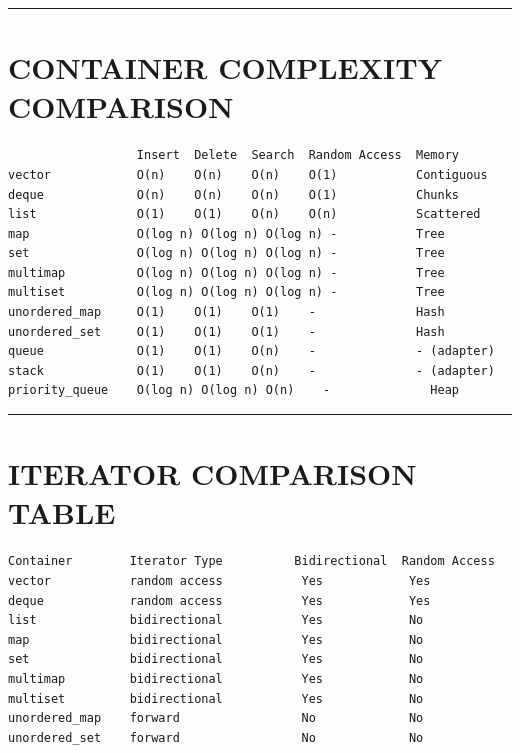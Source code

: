 \begin{center}\rule{0.5\linewidth}{0.5pt}\end{center}

\hypertarget{container-complexity-comparison}{%
\section{CONTAINER COMPLEXITY
COMPARISON}\label{container-complexity-comparison}}

\begin{lstlisting}
                  Insert  Delete  Search  Random Access  Memory
vector            O(n)    O(n)    O(n)    O(1)           Contiguous
deque             O(n)    O(n)    O(n)    O(1)           Chunks
list              O(1)    O(1)    O(n)    O(n)           Scattered
map               O(log n) O(log n) O(log n) -           Tree
set               O(log n) O(log n) O(log n) -           Tree
multimap          O(log n) O(log n) O(log n) -           Tree
multiset          O(log n) O(log n) O(log n) -           Tree
unordered_map     O(1)    O(1)    O(1)    -              Hash
unordered_set     O(1)    O(1)    O(1)    -              Hash
queue             O(1)    O(1)    O(n)    -              - (adapter)
stack             O(1)    O(1)    O(n)    -              - (adapter)
priority_queue    O(log n) O(log n) O(n)    -              Heap
\end{lstlisting}

\begin{center}\rule{0.5\linewidth}{0.5pt}\end{center}

\hypertarget{iterator-comparison-table}{%
\section{ITERATOR COMPARISON TABLE}\label{iterator-comparison-table}}

\begin{lstlisting}
Container        Iterator Type          Bidirectional  Random Access
vector           random access           Yes            Yes
deque            random access           Yes            Yes
list             bidirectional           Yes            No
map              bidirectional           Yes            No
set              bidirectional           Yes            No
multimap         bidirectional           Yes            No
multiset         bidirectional           Yes            No
unordered_map    forward                 No             No
unordered_set    forward                 No             No
\end{lstlisting}

